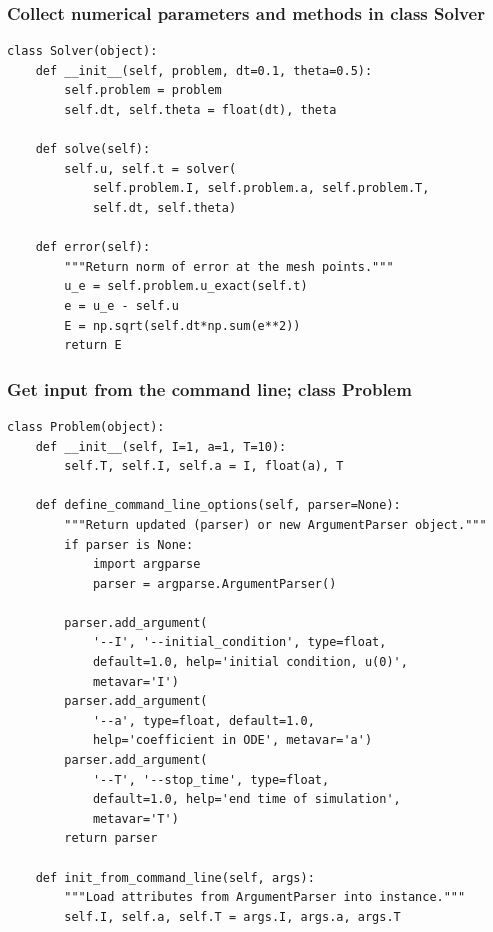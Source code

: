 \documentclass{beamer}
\begin{document}
\begin{frame}
\frametitle{Collect numerical parameters and methods in class Solver}

\begin{verbatim}
class Solver(object):
    def __init__(self, problem, dt=0.1, theta=0.5):
        self.problem = problem
        self.dt, self.theta = float(dt), theta

    def solve(self):
        self.u, self.t = solver(
            self.problem.I, self.problem.a, self.problem.T,
            self.dt, self.theta)

    def error(self):
        """Return norm of error at the mesh points."""
        u_e = self.problem.u_exact(self.t)
        e = u_e - self.u
        E = np.sqrt(self.dt*np.sum(e**2))
        return E
\end{verbatim}
\end{frame}

\begin{frame}
\frametitle{Get input from the command line; class Problem}

\begin{verbatim}
class Problem(object):
    def __init__(self, I=1, a=1, T=10):
        self.T, self.I, self.a = I, float(a), T

    def define_command_line_options(self, parser=None):
        """Return updated (parser) or new ArgumentParser object."""
        if parser is None:
            import argparse
            parser = argparse.ArgumentParser()

        parser.add_argument(
            '--I', '--initial_condition', type=float,
            default=1.0, help='initial condition, u(0)',
            metavar='I')
        parser.add_argument(
            '--a', type=float, default=1.0,
            help='coefficient in ODE', metavar='a')
        parser.add_argument(
            '--T', '--stop_time', type=float,
            default=1.0, help='end time of simulation',
            metavar='T')
        return parser

    def init_from_command_line(self, args):
        """Load attributes from ArgumentParser into instance."""
        self.I, self.a, self.T = args.I, args.a, args.T
\end{verbatim}
\end{frame}
\end{document}
